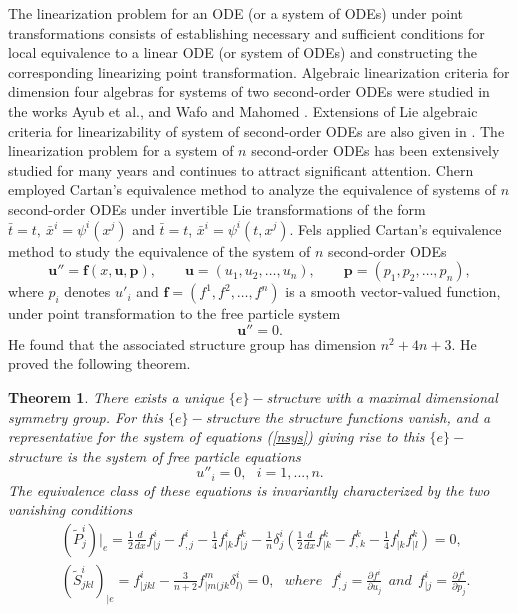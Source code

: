 \documentclass[12pt]{article}
\newtheorem{theorem}{Theorem}[section]
\begin{document}
The linearization problem for an ODE (or a system of ODEs) under point transformations consists of establishing necessary and sufficient conditions for local equivalence to a linear ODE (or system of ODEs) and constructing the corresponding linearizing point transformation. Algebraic linearization criteria for dimension four algebras for systems of two second-order ODEs were studied in the works Ayub et al., and Wafo and Mahomed \cite{Ay,WM}. Extensions of Lie algebraic criteria for linearizability of system of second-order ODEs are also given in \cite{Ay}. The linearization problem for a system of $n$ second-order ODEs has been extensively studied for many years and continues to attract significant attention. Chern \cite{R3} employed Cartan's equivalence method to analyze the equivalence of systems of $n$ second-order ODEs under invertible Lie transformations of the form $\bar{t}=t,~ \bar{x}^{i}=\psi^{i}(x^{j})$ and $\bar{t}=t$, $\bar{x}^{i}=\psi^{i}(t, x^{j})$. Fels \cite{p15} applied Cartan's equivalence method to study the equivalence of the system of $n$ second-order ODEs
\begin{equation}\label{nsys}
\mathbf{u}'' = \mathbf{f}(x,\mathbf{u},\mathbf{p}), 
\qquad \mathbf{u}=(u_1,u_2,\dots,u_n), \qquad  \mathbf{p}=(p_1,p_2,\dots,p_n),
\end{equation}
where $p_i$ denotes $u'_i$ and $\mathbf{f}=(f^1,f^2,\dots,f^n)$ is a smooth 
vector-valued function, under point transformation to the free particle system 
\begin{equation}
\mathbf{u}'' =0.
\end{equation}
He found that the associated structure group has dimension $n^2+4n+3$. He proved the following theorem.
\begin{theorem}\cite{p15}
There exists a unique $\{e\}-$structure with a maximal dimensional symmetry group. For this $\{e\}-$structure the structure functions vanish, and a representative for the system of equations (\ref{nsys}) giving rise to this $\{e\}-$structure is the system of free particle equations 
\begin{equation}\label{m}
u''_i=0,~~~i=1, ..., n.
\end{equation}
The equivalence class of these equations is invariantly characterized by the two vanishing conditions
\begin{equation}\label{Fels}
\begin{aligned}
&(\tilde{P}^{i}_{j})|_{e}=\frac{1}{2}\frac{d}{dx}f^{i}_{|j}-f^{i}_{,j}-\frac{1}{4}f^{i}_{|k}f^{k}_{|j}-\frac{1}{n}\delta^{i}_{j}(\frac{1}{2}\frac{d}{dx}f^{k}_{|k}-f^{k}_{,k}-\frac{1}{4}f^{l}_{|k}f^{k}_{|l})=0,\\
&(\tilde{S}^{i}_{jkl})_{|e}=f^{i}_{|jkl}-\frac{3}{n+2}f^{m}_{|m(jk}\delta^{i}_{l)}=0, ~~~ where~~~ f^{i}_{,j}=\frac{\partial f^{i}}{\partial u_{j}} ~~and~~ f^{i}_{|j}=\frac{\partial f^{i}}{\partial p_{ j}}.\\
\end{aligned}
\end{equation}\end{theorem}
\end{document}
